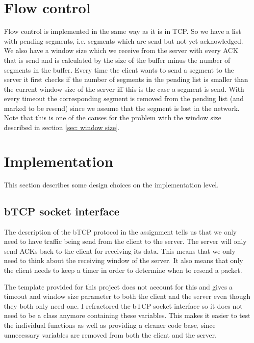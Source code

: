 \documentclass[a4paper]{article}
\begin{document}
\section{Flow control}
Flow control is implemented in the same way as it is in TCP. So we have a list with pending segments, i.e. segments which are send but not yet acknowledged. We also have a window size which we receive from the server with every ACK that is send and is calculated by the size of the buffer minus the number of segments in the buffer. Every time the client wants to send a segment to the server it first checks if the number of segments in the pending list is smaller than the current window size of the server iff this is the case a segment is send. With every timeout the corresponding segment is removed from the pending list (and marked to be resend) since we assume that the segment is lost in the network. Note that this is one of the causes for the problem with the window size described in section \ref{sec: window size}.

\section{Implementation}
This section describes some design choices on the implementation level.

	\subsection{bTCP socket interface}
	The description of the bTCP protocol in the assignment tells us that we only need to have traffic being send from the client to the server. The server will only send ACKs back to the client for receiving its data. This means that we only need to think about the receiving window of the server. It also means that only the client needs to keep a timer in order to determine when to resend a packet.

	The template provided for this project does not account for this and gives a timeout and window size parameter to both the client and the server even though they both only need one. I refractored the bTCP socket interface so it does not need to be a class anymore containing these variables. This makes it easier to test the individual functions as well as providing a cleaner code base, since unnecessary variables are removed from both the client and the server.
\end{document}
